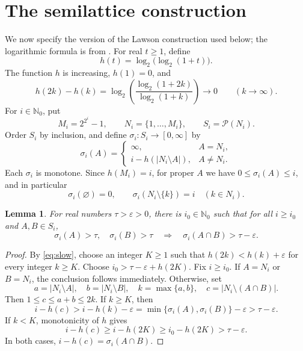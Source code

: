 \documentclass[11pt]{amsart}
\newtheorem{lemma}[theorem]{Lemma}
\theoremstyle{definition}
\theoremstyle{remark}
\numberwithin{equation}{section}
\newcommand{\NN}{\mathbb N}
\newcommand{\PP}{\mathcal P}
\begin{document}
\section{The semilattice construction}\label{sec:construction}

We now specify the version of the Lawson construction used below;
the logarithmic formula is from \cite{GL2022}.
For real $t\geq 1$, define
\[
h(t)=\log_2\bigl(\log_2(1+t)\bigr).
\]
The function $h$ is increasing, $h(1)=0$, and
\begin{equation}\label{eq:slow}
h(2k)-h(k)
 =\log_2\!\left(\frac{\log_2(1+2k)}{\log_2(1+k)}\right)
 \longrightarrow 0\qquad(k\longrightarrow\infty).
\end{equation}
For $i\in\NN_0$, put
\begin{equation}\label{eq:coordinates}
M_i=2^{2^i}-1,\qquad N_i=\{1,\ldots,M_i\},\qquad S_i=\PP(N_i).
\end{equation}
Order $S_i$ by inclusion, and define $\sigma_i:S_i\to[0,\infty]$ by
\begin{equation}\label{eq:sigma}
\sigma_i(A)=
\begin{cases}
\infty,&A=N_i,\\
i-h(|N_i\setminus A|),&A\ne N_i.
\end{cases}
\end{equation}
Each $\sigma_i$ is monotone. Since $h(M_i)=i$, for proper $A$ we have
$0\leq\sigma_i(A)\leq i$, and in particular
\begin{equation}\label{eq:sigma-special}
\sigma_i(\varnothing)=0,
\qquad \sigma_i(N_i\setminus\{k\})=i\quad(k\in N_i).
\end{equation}

\begin{lemma}\label{lem:slow-intersection}
For real numbers $\tau>\varepsilon>0$, there is $i_0\in\NN_0$ such
that for all $i\geq i_0$ and $A,B\in S_i$,
\[
\sigma_i(A)>\tau,\quad\sigma_i(B)>\tau
\quad\Longrightarrow\quad
\sigma_i(A\cap B)>\tau-\varepsilon.
\]
\end{lemma}

\begin{proof}
By \eqref{eq:slow}, choose an integer $K\geq1$ such that
$h(2k)<h(k)+\varepsilon$ for every integer $k\geq K$.
Choose $i_0>\tau-\varepsilon+h(2K)$. Fix $i\geq i_0$.
If $A=N_i$ or $B=N_i$, the conclusion follows immediately.
Otherwise, set
\[
a=|N_i\setminus A|,\quad b=|N_i\setminus B|,\quad
k=\max\{a,b\},\quad c=|N_i\setminus(A\cap B)|.
\]
Then $1\leq c\leq a+b\leq 2k$. If $k\geq K$, then
\[
i-h(c)>i-h(k)-\varepsilon
 =\min\{\sigma_i(A),\sigma_i(B)\}-\varepsilon
 >\tau-\varepsilon.
\]
If $k<K$, monotonicity of $h$ gives
\[
i-h(c)\geq i-h(2K)\geq i_0-h(2K)>\tau-\varepsilon.
\]
In both cases, $i-h(c)=\sigma_i(A\cap B)$.
\end{proof}
\end{document}

